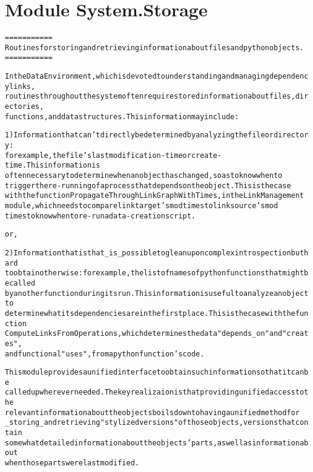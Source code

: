 %
%
%


\section{Module System.Storage}

    \label{System:Storage}
\begin{alltt}

===========
Routines for storing and retrieving information about files and python objects. 
===========

In the Data Environment, which is devoted to understanding and managing dependency links, 
routines throughout the system often require stored information about files, directories, 
functions, and data structures.   This information may include:
                
1) Information that can't directly be determined by analyzing the file or directory:  
for example, the file's last modification-time or create-time.    This information is 
often necessary to determine when an object has changed, so as to know when to 
trigger the re-running of a process that depends on the object.   This is the case
with the function PropagateThroughLinkGraphWithTimes, in the LinkManagement 
module, which needs to compare link target's mod times to link source's mod 
times to know when to re-run a data-creation script. 

or,             

2) Information that is that \_is\_ possible to glean upon complex introspection but hard 
to obtain otherwise: for example, the list of names of python functions that might be called 
by another function during its run.  This information is useful to analyze an object to 
determine what its dependencies are in the first place.   This is the case with the function 
ComputeLinksFromOperations, which determines the data "depends\_on" and "creates", 
and functional "uses",  from a python function's code.  
                
This module provides a unified interface to obtain such information so that  it can be 
called up wherever needed.   The key realizaion is that providing unified access to the
relevant information about the objects boils down to having a unified method for 
\_storing\_ and retrieving "stylized versions" of those objects,  versions that contain 
somewhat detailed information about the objects' parts, as well as information about
when those parts were last modified.   


\end{alltt}

